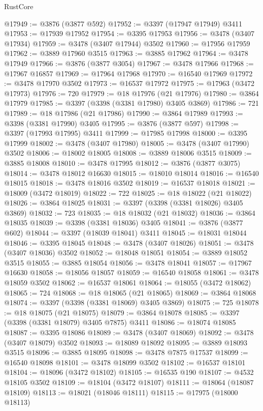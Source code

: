 \begin{lexlean}{RustCore}
\begin{coremodule}
@17949 := @3876 (@3877 @592)
@17952 := @3397 (@17947 @17949) @3411
@17953 := @17939 @17952
@17954 := @3395 @17953
@17956 := @3478 (@3407 @17934)
@17959 := @3478 (@3407 @17944) @3502
@17960 := @17956 @17959
@17962 := @3889 @17960 @3515
@17963 := @3885 @17962
@17964 := @3478 @17949
@17966 := @3876 (@3877 @3054)
@17967 := @3478 @17966
@17968 := @17967 @16857
@17969 := @17964 @17968
@17970 := @16540 @17969
@17972 := @3478 @17970 @3502
@17973 := @16537 @17972
@17975 := @17963 (@3472 @17973)
@17976 := 720
@17979 := @18 @17976 (@21 @17976)
@17980 := @3864 @17979
@17985 := @3397 (@3398 (@3381 @17980) @3405 @3869)
@17986 := 721
@17989 := @18 @17986 (@21 @17986)
@17990 := @3864 @17989
@17993 := @3398 (@3381 @17990) @3405
@17995 := @3876 (@3877 @597)
@17998 := @3397 (@17993 @17995) @3411
@17999 := @17985 @17998
@18000 := @3395 @17999
@18002 := @3478 (@3407 @17980)
@18005 := @3478 (@3407 @17990) @3502
@18006 := @18002 @18005
@18008 := @3889 @18006 @3515
@18009 := @3885 @18008
@18010 := @3478 @17995
@18012 := @3876 (@3877 @3075)
@18014 := @3478 @18012 @16630
@18015 := @18010 @18014
@18016 := @16540 @18015
@18018 := @3478 @18016 @3502
@18019 := @16537 @18018
@18021 := @18009 (@3472 @18019)
@18022 := 722
@18025 := @18 @18022 (@21 @18022)
@18026 := @3864 @18025
@18031 := @3397 (@3398 (@3381 @18026) @3405 @3869)
@18032 := 723
@18035 := @18 @18032 (@21 @18032)
@18036 := @3864 @18035
@18039 := @3398 (@3381 @18036) @3405
@18041 := @3876 (@3877 @602)
@18044 := @3397 (@18039 @18041) @3411
@18045 := @18031 @18044
@18046 := @3395 @18045
@18048 := @3478 (@3407 @18026)
@18051 := @3478 (@3407 @18036) @3502
@18052 := @18048 @18051
@18054 := @3889 @18052 @3515
@18055 := @3885 @18054
@18056 := @3478 @18041
@18057 := @17967 @16630
@18058 := @18056 @18057
@18059 := @16540 @18058
@18061 := @3478 @18059 @3502
@18062 := @16537 @18061
@18064 := @18055 (@3472 @18062)
@18065 := 724
@18068 := @18 @18065 (@21 @18065)
@18069 := @3864 @18068
@18074 := @3397 (@3398 (@3381 @18069) @3405 @3869)
@18075 := 725
@18078 := @18 @18075 (@21 @18075)
@18079 := @3864 @18078
@18085 := @3397 (@3398 (@3381 @18079) @3405 @7875) @3411
@18086 := @18074 @18085
@18087 := @3395 @18086
@18089 := @3478 (@3407 @18069)
@18092 := @3478 (@3407 @18079) @3502
@18093 := @18089 @18092
@18095 := @3889 @18093 @3515
@18096 := @3885 @18095
@18098 := @3478 @7875 @17537
@18099 := @16540 @18098
@18101 := @3478 @18099 @3502
@18102 := @16537 @18101
@18104 := @18096 (@3472 @18102)
@18105 := @16535 @190
@18107 := @4532 @18105 @3502
@18109 := @18104 (@3472 @18107)
@18111 := @18064 (@18087 @18109)
@18113 := @18021 (@18046 @18111)
@18115 := @17975 (@18000 @18113)

\end{coremodule}
\end{lexlean}
